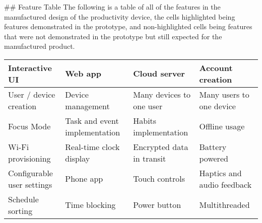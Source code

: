 ## Feature Table
The following is a table of all of the features in the manufactured design of the productivity device, the cells highlighted being features demonstrated in the prototype, and non-highlighted cells being features that were not demonstrated in the prototype but still expected for the manufactured product.

\begin{table}
\centering
\small
\begin{tabular}{|p{}|p{}|p{}|p{}|}
  \hline
  \cellcolor[HTML]{CFE2F3}Interactive UI           & \cellcolor[HTML]{CFE2F3}Web app                       & \cellcolor[HTML]{CFE2F3}Cloud server               & \cellcolor[HTML]{CFE2F3}Account creation         \\ \hline
  \cellcolor[HTML]{CFE2F3}User / device creation   & \cellcolor[HTML]{CFE2F3}Device management             & \cellcolor[HTML]{CFE2F3}Many devices to one user   & \cellcolor[HTML]{CFE2F3}Many users to one device \\ \hline
  \cellcolor[HTML]{CFE2F3}Focus Mode               & \cellcolor[HTML]{CFE2F3}Task and event implementation & \cellcolor[HTML]{CFE2F3}Habits implementation      & \cellcolor[HTML]{CFE2F3}Offline usage            \\ \hline
  \cellcolor[HTML]{CFE2F3}Wi-Fi provisioning       & \cellcolor[HTML]{CFE2F3}Real-time clock display       & \cellcolor[HTML]{CFE2F3} Encrypted data in transit & Battery powered                                  \\ \hline
  Configurable user settings                       & Phone app                                             & Touch controls                                     & Haptics and audio feedback                       \\ \hline
  Schedule sorting                                 & Time blocking                                         & Power button                                       & Multithreaded                                       \\ \hline
\end{tabular}
\end{table}

\renewcommand{\thefootnote}{\roman{footnote}}
